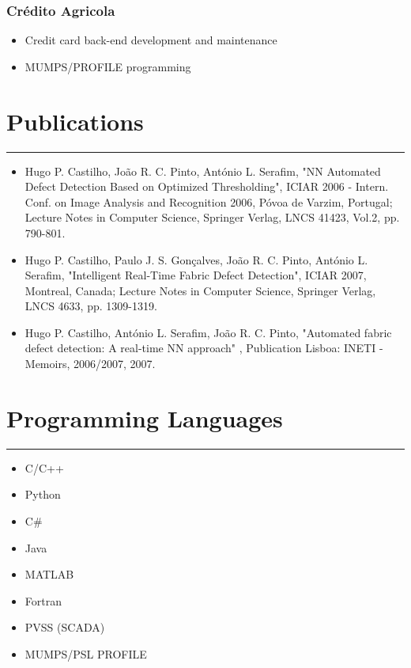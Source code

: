 \documentclass[a4paper,english]{article}
\newcommand{\topic}[1]{
\section*{#1} \vspace{-6mm}
\rule{\columnwidth}{.25mm}
}
\begin{document}
    \subsubsection*{Crédito Agricola}
    \begin{itemize}
    \setlength{\itemsep}{-1mm}
        \item[] Credit card back-end development and maintenance
        \item[] MUMPS/PROFILE programming
    \end{itemize}

\topic{Publications}
\begin{itemize}
    \item[] Hugo P. Castilho, João R. C. Pinto, António L. Serafim, "NN
Automated Defect Detection Based on Optimized Thresholding", ICIAR 2006 -
Intern. Conf. on Image Analysis and Recognition 2006, Póvoa
de Varzim, Portugal; Lecture Notes in Computer Science, Springer Verlag,
LNCS 41423, Vol.2, pp. 790-801.
    \item[] Hugo P. Castilho, Paulo J. S. Gonçalves, João R. C. Pinto, António
L. Serafim, "Intelligent Real-Time Fabric Defect Detection", ICIAR
2007, Montreal, Canada; Lecture Notes in Computer Science, Springer Verlag,
LNCS 4633, pp. 1309-1319.
    \item[] Hugo P. Castilho, António L. Serafim, João R. C. Pinto, "Automated
fabric defect detection: A real-time NN approach" , Publication Lisboa: INETI - 
Memoirs, 2006/2007, 2007.
\end{itemize}

\topic{Programming Languages}
\begin{itemize}
\setlength{\itemsep}{-1mm}
    \item C/C++
    \item Python
    \item C\#
    \item Java
    \item MATLAB
    \item Fortran
    \item PVSS (SCADA)
    \item MUMPS/PSL PROFILE
\end{itemize}
\end{document}
